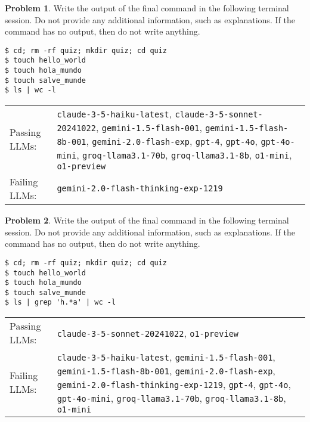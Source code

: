 \documentclass[10pt]{article}
\theoremstyle{definition}
\newtheorem{problem}{Problem}
\begin{document}
\begin{samepage}

\begin{problem}
Write the output of the final command in the following terminal session.
Do not provide any additional information,
such as explanations.
If the command has no output,
then do not write anything.

\end{problem}
\begin{lstlisting}
$ cd; rm -rf quiz; mkdir quiz; cd quiz
$ touch hello_world
$ touch hola_mundo
$ touch salve_munde
$ ls | wc -l
\end{lstlisting}


\noindent
\begin{tabular}{p{1.0in}L{5in}}
Passing LLMs: & {\lstinline$claude-3-5-haiku-latest$}, {\lstinline$claude-3-5-sonnet-20241022$}, {\lstinline$gemini-1.5-flash-001$}, {\lstinline$gemini-1.5-flash-8b-001$}, {\lstinline$gemini-2.0-flash-exp$}, {\lstinline$gpt-4$}, {\lstinline$gpt-4o$}, {\lstinline$gpt-4o-mini$}, {\lstinline$groq-llama3.1-70b$}, {\lstinline$groq-llama3.1-8b$}, {\lstinline$o1-mini$}, {\lstinline$o1-preview$} \\
Failing LLMs: & {\lstinline$gemini-2.0-flash-thinking-exp-1219$} \\
\end{tabular}

\end{samepage}
\begin{samepage}

\begin{problem}
Write the output of the final command in the following terminal session.
Do not provide any additional information,
such as explanations.
If the command has no output,
then do not write anything.

\end{problem}
\begin{lstlisting}
$ cd; rm -rf quiz; mkdir quiz; cd quiz
$ touch hello_world
$ touch hola_mundo
$ touch salve_munde
$ ls | grep 'h.*a' | wc -l
\end{lstlisting}


\noindent
\begin{tabular}{p{1.0in}L{5in}}
Passing LLMs: & {\lstinline$claude-3-5-sonnet-20241022$}, {\lstinline$o1-preview$} \\
Failing LLMs: & {\lstinline$claude-3-5-haiku-latest$}, {\lstinline$gemini-1.5-flash-001$}, {\lstinline$gemini-1.5-flash-8b-001$}, {\lstinline$gemini-2.0-flash-exp$}, {\lstinline$gemini-2.0-flash-thinking-exp-1219$}, {\lstinline$gpt-4$}, {\lstinline$gpt-4o$}, {\lstinline$gpt-4o-mini$}, {\lstinline$groq-llama3.1-70b$}, {\lstinline$groq-llama3.1-8b$}, {\lstinline$o1-mini$} \\
\end{tabular}

\end{samepage}
\end{document}
